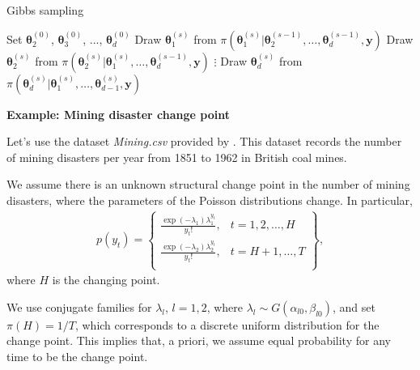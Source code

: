 \begin{algorithm}[h!]
	\caption{Gibbs sampling}\label{Alg:Gibbs}
	\begin{algorithmic}[1]  		 			
		\State Set $\bm{\theta}_2^{(0)}$, $\bm{\theta}_3^{(0)}$, ..., $\bm{\theta}_d^{(0)}$
		\State Draw $\bm{\theta}_1^{(s)}$ from $\pi(\bm{\theta}_1^{(s)}|\bm{\theta}_2^{(s-1)},\dots,\bm{\theta}_d^{(s-1)},\bm{y})$
		\State Draw $\bm{\theta}_2^{(s)}$ from $\pi(\bm{\theta}_2^{(s)}|\bm{\theta}_1^{(s)},\dots,\bm{\theta}_d^{(s-1)},\bm{y})$
		\State $\vdots$
		\State Draw $\bm{\theta}_d^{(s)}$ from $\pi(\bm{\theta}_d^{(s)}|\bm{\theta}_1^{(s)},\dots,\bm{\theta}_{d-1}^{(s)},\bm{y})$ 
		\EndFor 
		\end{algorithmic} 
\end{algorithm}

\textbf{Example: Mining disaster change point}

Let's use the dataset \textit{Mining.csv} provided by \cite{carlin1992hierarchical}. This dataset records the number of mining disasters per year from 1851 to 1962 in British coal mines.

We assume there is an unknown structural change point in the number of mining disasters, where the parameters of the Poisson distributions change. In particular,
\begin{align*}
	p(y_t)=\begin{Bmatrix}
		\frac{\exp(-\lambda_1)\lambda_1^{y_t}}{y_t!}, & t=1,2,\dots,H\\
		\frac{\exp(-\lambda_2)\lambda_2^{y_t}}{y_t!}, & t=H+1,\dots,T\\
	\end{Bmatrix},
\end{align*}  
where $H$ is the changing point.

We use conjugate families for $\lambda_l$, $l = 1, 2$, where $\lambda_l \sim G(\alpha_{l0}, \beta_{l0})$, and set $\pi(H) = 1 / T$, which corresponds to a discrete uniform distribution for the change point. This implies that, a priori, we assume equal probability for any time to be the change point.

